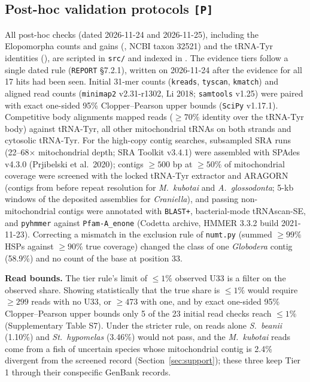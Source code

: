 \documentclass[11pt, a4paper]{article}
\begin{document}
\subsection{Post-hoc validation protocols \texttt{[P]}}
All post-hoc checks (dated 2026-11-24 and 2026-11-25), including the Elopomorpha counts and gains (, NCBI taxon 32521) and the tRNA-Tyr identities (), are scripted in \texttt{src/} and indexed in . The evidence tiers follow a single dated rule (\texttt{REPORT} \S 7.2.1), written on 2026-11-24 after the evidence for all 17 hits had been seen. Initial 31-mer counts (\texttt{kreads}, \texttt{tyscan}, \texttt{kmatch}) and aligned read counts (\texttt{minimap2} v2.31-r1302, Li 2018; \texttt{samtools} v1.25) were paired with exact one-sided 95\% Clopper--Pearson upper bounds (\texttt{SciPy} v1.17.1). Competitive body alignments mapped reads ($\ge 70\%$ identity over the tRNA-Tyr body) against tRNA-Tyr, all other mitochondrial tRNAs on both strands and cytosolic tRNA-Tyr. For the high-copy contig searches, subsampled SRA runs (22--68$\times$ mitochondrial depth; SRA Toolkit v3.4.1) were assembled with SPAdes v4.3.0 (Prjibelski et al.\ 2020); contigs $\ge 500$ bp at $\ge 50\%$ of mitochondrial coverage were screened with the locked tRNA-Tyr extractor and ARAGORN (contigs from before repeat resolution for \textit{M.\ kubotai} and \textit{A.\ glossodonta}; 5-kb windows of the deposited assemblies for \textit{Craniella}), and passing non-mitochondrial contigs were annotated with \texttt{BLAST+}, bacterial-mode tRNAscan-SE, and \texttt{pyhmmer} against \texttt{Pfam-A\_enone} (Codetta archive, HMMER 3.3.2 build 2021-11-23). Correcting a mismatch in the exclusion rule of \texttt{numt.py} (summed $\ge 99\%$ HSPs against $\ge 90\%$ true coverage) changed the class of one \textit{Globodera} contig (58.9\%) and no count of the base at position 33.

\textbf{Read bounds.} The tier rule's limit of $\le 1\%$ observed U33 is a filter on the observed share. Showing statistically that the true share is $\le 1\%$ would require $\ge 299$ reads with no U33, or $\ge 473$ with one, and by exact one-sided 95\% Clopper--Pearson upper bounds only 5 of the 23 initial read checks reach $\le 1\%$ (Supplementary Table S7). Under the stricter rule, on reads alone \textit{S.\ beanii} (1.10\%) and \textit{St.\ hypomelas} (3.46\%) would not pass, and the \textit{M.\ kubotai} reads come from a fish of uncertain species whose mitochondrial contig is 2.4\% divergent from the screened record (Section~\ref{sec:support}); these three keep Tier 1 through their conspecific GenBank records.
\end{document}
